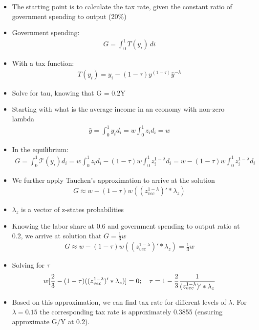 \documentclass{article}
\begin{document}
\begin{itemize}
    \item The starting point is to calculate the tax rate, given the constant ratio of government spending to output (20\%)
    \item Government spending:
    \begin{gather*}
    G = \int^1_0 T(y_i) \,di 
    \end{gather*}
    \item With a tax function:
    \begin{gather*}
        T(y_i) = y_i - (1-\tau)y^{(1-\tau)}\bar{y}^{-\lambda} 
    \end{gather*}
    \item Solve for tau, knowing that G = 0.2Y
    \item Starting with what is the average income in an economy with non-zero lambda
    \begin{gather*}
        \bar{y} = \int^1_0 y_i d_i = w \int^1_0 z_i d_i  = w
    \end{gather*}
    \item In the equilibrium:
    \begin{gather*}
        G = \int^{1}_0 \mathcal{T}(y_i)d_i = w \int^{1}_0z_i d_i - (1-\tau) w \int^{1}_0z_i^{1-\lambda} d_i = w - (1-\tau)w\int_0^1z_i^{1-\lambda}d_i 
    \end{gather*}
    \item We further apply Tauchen's approximation to arrive at the solution
    \begin{gather*}
        G \approx w-(1-\tau)w((z_{vec}^{1-\lambda})' * \lambda_z)
    \end{gather*}
    \item \(\lambda_z\) is a vector of z-states probabilities
    \item  Knowing the labor share at 0.6 and government spending to output ratio at 0.2, we arrive at solution that \(G = \frac{1}{3} w\)
    \begin{gather*}
        G \approx w-(1-\tau)w((z_{vec}^{1-\lambda})' * \lambda_z) = \frac{1}{3}w
    \end{gather*}
    \item Solving for \(\tau\)
    \begin{gather*}
        w[\frac{2}{3}-(1-\tau)((z_{vec}^{1-\lambda})' * \lambda_z)]=0;
        \newline
        \quad \tau = 1 -\frac{2}{3} \frac{1}{(z_{vec}^{1-\lambda})' * \lambda_z}
    \end{gather*}
    \item Based on this approximation, we can find tax rate for different levels of \(\lambda\). For \(\lambda = 0.15\) the corresponding tax rate is approximately 0.3855 (ensuring approximate G/Y at 0.2). 
    
    
\end{itemize}
\end{document}
